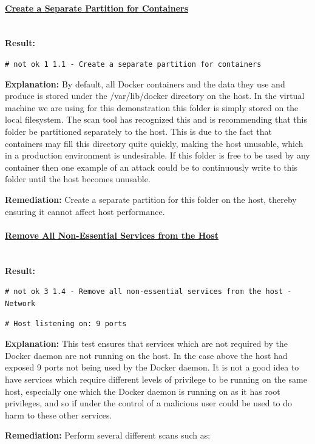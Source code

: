\documentclass{article}
\begin{document}
\paragraph{\underline{Create a Separate Partition for Containers}}\mbox{}\\

\textbf{Result:} 

\texttt{\# not ok 1 1.1  - Create a separate partition for containers}

\textbf{Explanation:} By default, all Docker containers and the data they use and produce is stored under the /var/lib/docker directory on the host. In the virtual machine we are using for this demonstration this folder is simply stored on the local filesystem. The scan tool has recognized this and is recommending that this folder be partitioned separately to the host. This is due to the fact that containers may fill this directory quite quickly, making the host unusable, which in a production environment is undesirable. If this folder is free to be used by any container then one example of an attack could be to continuously write to this folder until the host becomes unusable.

\textbf{Remediation:} Create a separate partition for this folder on the host, thereby ensuring it cannot affect host performance.

\paragraph{\underline{Remove All Non-Essential Services from the Host}}\mbox{}\\

\textbf{Result:} 

\texttt{\# not ok 3 1.4  - Remove all non-essential services from the host - Network}

\texttt{\# Host listening on: 9 ports}

\textbf{Explanation:} This test ensures that services which are not required by the Docker daemon are not running on the host. In the case above the host had exposed 9 ports not being used by the Docker daemon. It is not a good idea to have services which require different levels of privilege to be running on the same host, especially one which the Docker daemon is running on as it has root privileges, and so if under the control of a malicious user could be used to do harm to these other services.

\textbf{Remediation:} Perform several different scans such as:
\end{document}
